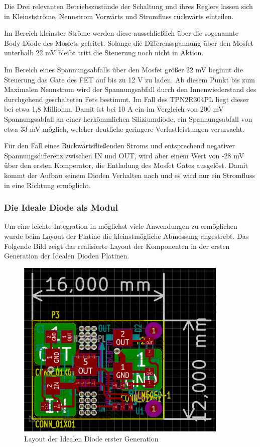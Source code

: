 Die Drei relevanten Betriebszustände der Schaltung und ihres Reglers lassen sich in Kleinstströme, Nennstrom Vorwärts und Stromfluss rückwärts einteilen.

Im Bereich kleinster Ströme werden diese ausschließlich über die sogenannte Body Diode des Mosfets geleitet. Solange die Differensspannung über den Mosfet unterhalb 22 mV bleibt tritt die Steuerung noch nicht in Aktion.

Im Bereich eines Spannungsabfalls über den Mosfet größer 22 mV beginnt die Steuerung das Gate des FET auf bis zu 12 V zu laden. Ab diesem Punkt bis zum Maximalen Nennstrom wird der Spannungsabfall durch den Innenwiederstand des durchgehend geschalteten Fets bestimmt. Im Fall des TPN2R304PL liegt dieser bei etwa 1,8 Milliohm. Damit ist bei 10 A ein im Vergleich von 200 mV Spannungsabfall an einer herkömmlichen Siliziumdiode, ein Spannungsabfall von etwa 33 mV möglich, welcher deutliche geringere Verlustleistungen verursacht.

Für den Fall eines Rückwärtsfließenden Stroms und entsprechend negativer Spannungsdifferenz zwischen IN und OUT, wird aber einem Wert von -28 mV über den ersten Komperator, die Entladung des Mosfet Gates ausgelöst. Damit kommt der Aufbau seinem Dioden Verhalten nach und es wird nur ein Stromfluss in eine Richtung ermöglicht.

\subsubsection{Die Ideale Diode als Modul}

Um eine leichte Integration in möglichst viele Anwendungen zu ermöglichen wurde beim Layout der Platine die kleinstmögliche Abmessung angestrebt. 
Das Folgende Bild zeigt das realisierte Layout der Komponenten in der ersten Generation der Idealen Dioden Platinen.

\begin{figure}[H]
\centering
\includegraphics[width=0.9\textwidth]{bilder/Ideale_Diode/Ideale_Diode_Mini_rev01_ver00.png} 
\caption{Layout der Idealen Diode erster Generation} 
\label{fig:Layout der Idealen Diode erster Generation}
\end{figure}


